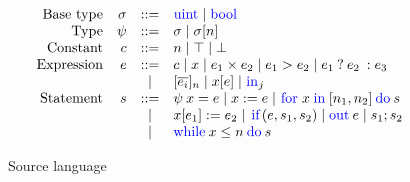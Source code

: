\begin{figure}
  \small
  \[
  \begin{array}{rrcl}
    \ftext{Base type} & \sigma &::=& \kw{uint} \mid \kw{bool}\\
    \ftext{Type} & \psi &::=& \sigma \mid \sigma[n]\\
    \ftext{Constant} & c &::=& n \mid \top \mid \bot\\
    \ftext{Expression} & e &::=& c \mid x \mid e_{1} \mulop e_{2} \mid e_{1} > e_{2} \mid \cond{e_{1}}{e_{2}}{e_{3}}\\
    & &\mid& [\overline{e_{i}}]_{n} \mid x[e] \mid \kw{in}_{j}\\
    \ftext{Statement} & s &::=& \psi\:x = e \mid x := e \mid \for{x}{n_{1}}{n_{2}}{s}\\
    & & \mid& x[e_{1}] := e_{2} \mid \ite{e}{s_{1}}{s_{2}} \mid \kw{out}\:e \mid s_{1}; s_{2}\\
    & & \mid& \loops{x}{n}{s}
  \end{array}
  \]
\caption{Source language}
\label{fig:srclang}
\end{figure}

